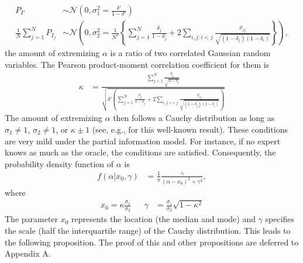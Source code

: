 \documentclass[11pt]{article}
\theoremstyle{definition}
\theoremstyle{definition}
\begin{document}
\begin{align*}
P_{I'} &\sim \mathcal{N}\left(0, \sigma^2_{1} = \frac{\delta'}{1-\delta'} \right)\\
\frac{1}{N}\sum_{j=1}^N P_{I_j} &\sim \mathcal{N}\left(0, \sigma^2_{2} =\frac{1}{N^2} \left\{ \sum_{j=1}^N \frac{\delta_j}{1-\delta_j} + 2 \sum_{i,j: i<j} \frac{\rho_{ij}}{\sqrt{(1-\delta_j)(1-\delta_i)}}\right\} \right),
\end{align*}
the amount of extremizing $\alpha$ is a ratio of two correlated Gaussian random variables. The Pearson product-moment correlation coefficient for them is
\begin{align*}
\kappa  &= \frac{ \sum_{j=1}^N \frac{\delta_j}{\sqrt{1-\delta_j}}}{\sqrt{\delta'  \left( \sum_{j=1}^N \frac{\delta_j}{1-\delta_j} + 2 \sum_{i,j: i<j} \frac{\rho_{ij}}{\sqrt{(1-\delta_j)(1-\delta_i)}}\right)}}
\end{align*}
The amount of extremizing $\alpha$ then follows a Cauchy distribution as long as $\sigma_1 \neq 1$, $\sigma_2 \neq 1$, or $\kappa \pm 1$ (see, e.g., \citet{cedilnik2004distribution} for this well-known result). These conditions are very mild under the partial information model. For instance, if no expert knows as much as the oracle, the conditions are satisfied. Consequently, the probability density function of $\alpha$ is
\begin{align*}
f(\alpha | x_0, \gamma) &= \frac{1}{\pi} \frac{\gamma}{(\alpha-x_0)^2+\gamma^2}, 
\end{align*}
where 
\begin{align*}
x_0 = \kappa \frac{\sigma_1}{\sigma_2} && \gamma &= \frac{\sigma_1}{\sigma_2} \sqrt{1-\kappa^2}
\end{align*}
The parameter $x_0$ represents the location (the median and mode) and $\gamma$ specifies the scale (half the interquartile range) of the Cauchy distribution. This leads to the following proposition. The proof of this and other propositions are deferred to Appendix A.
\end{document}
